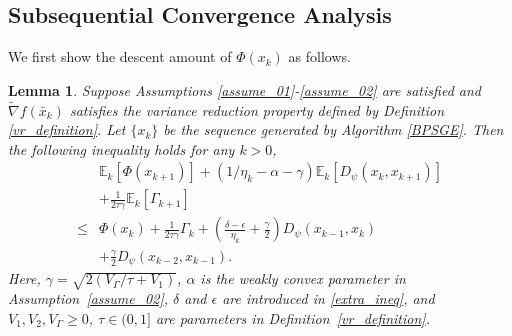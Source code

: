 \documentclass[letterpaper]{article} %
\newtheorem{lemma}{Lemma}
\begin{document}
	\subsection{Subsequential Convergence Analysis}
	We first show the descent amount of $\Phi(x_{k})$ as follows.
	\begin{lemma}\label{lemma_Phi_kk1}
		Suppose Assumptions \ref{assume_01}-\ref{assume_02} are satisfied  and  $\tilde{\nabla}f(\bar{x}_{k})$  satisfies the variance reduction property defined by Definition \ref{vr_definition}. Let $\{x_{k}\}$ be the sequence generated by Algorithm \ref{BPSGE}. Then the following inequality holds for any $k>0$,
		\begin{align*}
			&\mathbb{E}_{k}[\Phi(x_{k+1})] +\left(1/\eta_{k}-\alpha-\gamma\right)\mathbb{E}_{k}[D_{\psi}(x_{k},x_{k+1})]\\
			&+\frac{1}{2\tau\gamma}\mathbb{E}_{k}[\Gamma_{k+1}]\\
			\le&\Phi(x_{k})+\frac{1}{2\tau\gamma}\Gamma_{k}+\left(\frac{\delta-\epsilon}{\eta_{k}}+
			\frac{\gamma}{2}\right)D_{\psi}(x_{k-1},x_{k})\\
			&+\frac{\gamma}{2}D_{\psi}(x_{k-2},x_{k-1}).
		\end{align*}
		Here,  $\gamma=\sqrt{2(V_{\Gamma}/\tau+V_{1})}$,  $\alpha$ is the weakly convex parameter in Assumption~\ref{assume_02},  $\delta$ and $\epsilon$ are introduced in \eqref{extra_ineq}, and $V_{1}, V_{2},V_{\Gamma}\ge 0$, $\tau\in(0,1]$ are parameters in Definition~\ref{vr_definition}.
	\end{lemma}
\end{document}
